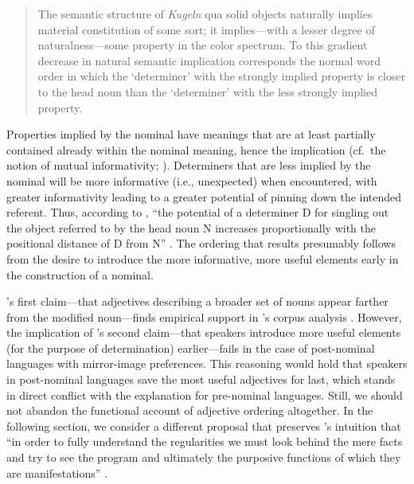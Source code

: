 \documentclass{sp}
\begin{document}
\begin{quotation}The semantic structure of \emph{Kugeln} qua solid objects naturally implies material constitution of some sort; it implies---with a lesser degree of naturalness---some property in the color spectrum. To this gradient decrease in natural semantic implication corresponds the normal word order in which the `determiner' with the strongly implied property is closer to the head noun than the `determiner' with the less strongly implied property. \end{quotation}

Properties implied by the nominal have meanings that are at least partially contained already within the nominal meaning, hence the implication (cf.~the notion of mutual informativity; \citealp{futrell2017}). Determiners that are less implied by the nominal will be more informative (i.e., unexpected) when encountered, with greater informativity leading to a greater potential of pinning down the intended referent.  Thus, according to \citeauthor{seiler1978}, ``the potential of a determiner D for singling out the object referred to by the head noun N increases proportionally with the positional distance of D from N'' . The ordering that results presumably follows from the desire to introduce the more informative, more useful elements early in the construction of a nominal.

\citeauthor{seiler1978}'s first claim---that adjectives describing a broader set of nouns appear farther from the modified noun---finds empirical support in \citeauthor{wulff2003}'s corpus analysis . However, the implication of \citeauthor{seiler1978}'s second claim---that speakers introduce more useful elements (for the purpose of determination) earlier---fails in the case of post-nominal languages with mirror-image preferences. This reasoning would hold that speakers in post-nominal languages save the most useful adjectives for last, which stands in direct conflict with the explanation for pre-nominal languages. Still, we should not abandon the functional account of adjective ordering altogether. In the following section, we consider a different proposal that preserves \citeauthor{seiler1978}'s intuition that ``in order to fully understand the regularities we must look behind the mere facts and try to see the program and ultimately the purposive functions of which they are manifestations'' .

%
%
\end{document}
